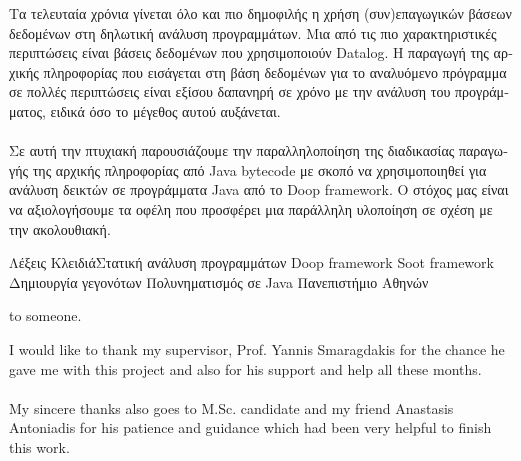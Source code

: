 \documentclass{dithesis}
\begin{document}
\begin{otherlanguage}{greek}
\begin{thesisabstract}[ΠΕΡΙΛΗΨΗ]
    Τα τελευταία χρόνια γίνεται όλο και πιο δημοφιλής η χρήση (συν)επαγωγικών βάσεων δεδομένων στη δηλωτική ανάλυση προγραμμάτων. Μια από τις πιο χαρακτηριστικές περιπτώσεις είναι βάσεις δεδομένων που χρησιμοποιούν Datalog. Η παραγωγή της αρχικής πληροφορίας που εισάγεται στη βάση δεδομένων για το αναλυόμενο πρόγραμμα σε πολλές περιπτώσεις είναι εξίσου δαπανηρή σε χρόνο με την ανάλυση του προγράμματος, ειδικά όσο το μέγεθος αυτού αυξάνεται. \\
    \\
    Σε αυτή την πτυχιακή παρουσιάζουμε την παραλληλοποίηση της διαδικασίας παραγωγής της αρχικής πληροφορίας από Java bytecode με σκοπό να χρησιμοποιηθεί για ανάλυση δεικτών σε προγράμματα Java από το Doop framework. Ο στόχος μας είναι να αξιολογήσουμε τα οφέλη που προσφέρει μια παράλληλη υλοποίηση σε σχέση με την ακολουθιακή.

                {Λέξεις Κλειδιά}{Στατική ανάλυση προγραμμάτων}
                                {Doop framework}
                                {Soot framework}
                                {Δημιουργία γεγονότων}
                                {Πολυνηματισμός σε Java}
                                {Πανεπιστήμιο Αθηνών}
\end{thesisabstract}
\end{otherlanguage}

\begin{thesisdedication}
to someone.
\end{thesisdedication}

\begin{thesisacknowledgments}[Acknowledgements]
    I would like to thank my supervisor, Prof. Yannis Smaragdakis for the chance he gave me with this project and also for his support and help all these months.
    \\
    \\
    My sincere thanks also goes to M.Sc. candidate and my friend Anastasis Antoniadis for his patience and guidance which had been very helpful to finish this work.
\end{thesisacknowledgments}

\renewcommand\contentsname{Contents}
\renewcommand\listfigurename{List of Figures}
\renewcommand\listtablename{List of Tables}
\renewcommand{\figurename}{Figure}
\renewcommand{\cftfigpresnum}{Figure }
\renewcommand{\tablename}{Table}
\renewcommand{\cfttabpresnum}{Table }
\end{document}
